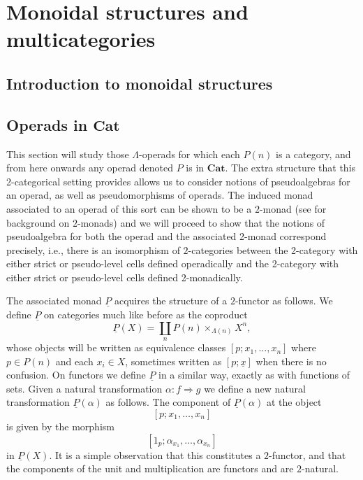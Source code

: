 \documentclass{amsbook} %
\newcommand{\mb}{\mathbf}
\numberwithin{section}{chapter}
\begin{document}
\chapter{Monoidal structures and multicategories}
 \section{Introduction to monoidal structures}
 

\section{Operads in \texorpdfstring{$\mb{Cat}$}{\textbf{Cat}}}\label{section:operads_in_Cat}

This section will study those $\Lambda$-operads for which each $P(n)$ is a category, and from here onwards any operad denoted $P$ is in $\mb{Cat}$. The extra structure that this 2-categorical setting provides allows us to consider notions of pseudoalgebras for an operad, as well as pseudomorphisms of operads. The induced monad associated to an operad of this sort can be shown to be a $2$-monad (see \cite{KS} for background on $2$-monads) and we will proceed to show that the notions of pseudoalgebra for both the operad and the associated 2-monad correspond precisely, i.e., there is an isomorphism of $2$-categories between the 2-category with either strict or pseudo-level cells defined operadically and the 2-category with either strict or pseudo-level cells defined 2-monadically.



The associated monad $\underline{P}$ acquires the structure of a $2$-functor as follows. We define $\underline{P}$ on categories much like before as  the coproduct
	\[
		\underline{P}(X) = \coprod_n P(n) \times_{\Lambda(n)} X^n,
	\]
whose objects will be written as equivalence classes $[p;x_1,\ldots,x_n]$ where $p \in P(n)$ and each $x_i \in X$, sometimes written as $[p;\underline{x}]$ when there is no confusion. On functors we define $\underline{P}$ in a similar way, exactly as with functions of sets. Given a natural transformation $\alpha \colon f \Rightarrow g$ we define a new natural transformation $\underline{P}(\alpha)$ as follows. The component of $\underline{P}(\alpha)$ at the object
	\[
		[p;x_1,\ldots,x_n]
	\]
is given by the morphism
	\[
		[1_p;\alpha_{x_1},\ldots,\alpha_{x_n}]
	\]
in $\underline{P}(X)$.
It is a simple observation that this constitutes a $2$-functor, and that the components of the unit and multiplication are functors and are $2$-natural.
\end{document}
